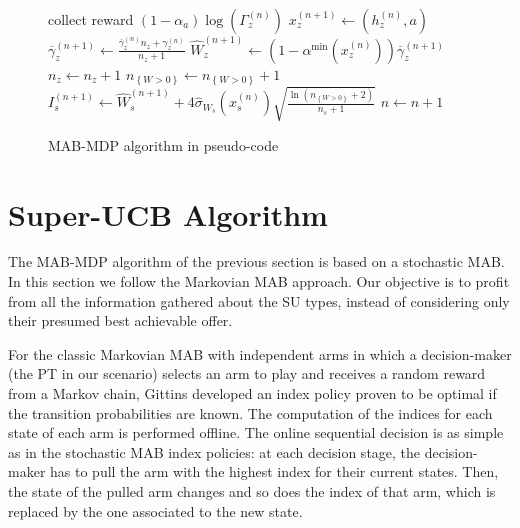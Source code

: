 \begin{figure}
\begin{algorithmic}[1]
    \ELSE
      \STATE collect reward $(1-\alpha_a)\log(\Gamma_z^{(n)})$
      \STATE $x_z^{(n+1)} \leftarrow (h_z^{(n)},a)$
      \STATE $\overline{\gamma}_{z}^{(n+1)} \leftarrow \frac{\overline{\gamma}_{z}^{(n)}n_z+\gamma_z^{(n)}}{n_z+1}$  
      \STATE $\widehat{W}_z^{(n+1)}\leftarrow (1-\alpha^{\text{min}}(x_z^{(n)}))\overline{\gamma}_z^{(n+1)}$
      \STATE $n_z \leftarrow n_z + 1$
      \STATE $n_{\left\{W>0\right\}} \leftarrow n_{\left\{W>0\right\}} + 1$
        \STATE $I_{s}^{(n+1)} \leftarrow \widehat{W}_{s}^{(n+1)} + 4\hat\sigma_{W_s}(x_s^{(n)}) \sqrt{\frac{\ln(n_{\left\{W>0\right\}} + 2)}{n_s+1}}$
      \ENDFOR
    \ENDIF
    \STATE $n \leftarrow n + 1$
  \ENDLOOP
\end{algorithmic}
\caption{MAB-MDP algorithm in pseudo-code}
\label{code:TLP}
\end{figure}

\section{Super-UCB Algorithm}\label{sec:Super}
The MAB-MDP algorithm of the previous section is based on a stochastic MAB. In this section we follow the Markovian MAB approach. Our objective is to profit from all the information gathered about the SU types, instead of considering only their presumed best achievable offer.

For the classic Markovian MAB with independent arms in which a decision-maker (the PT in our scenario) selects an arm to play and receives a random reward from a Markov chain, Gittins \cite{ref:Gittins2011} developed an index policy proven to be optimal if the transition probabilities are known.
The computation of the indices for each state of each arm is performed offline. 
The online sequential decision is as simple as in the stochastic MAB index policies: at each decision stage, the decision-maker has to pull the arm with the highest index for their current states. 
Then, the state of the pulled arm changes and so does the index of that arm, which is replaced by the one associated to the new state. 

